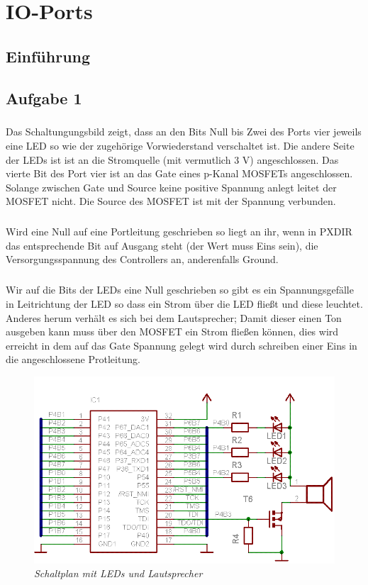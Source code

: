 \chapter{IO-Ports}

\section{Einführung}

\section{Aufgabe 1}

\paragraph*{}
Das Schaltungungsbild zeigt, dass an den Bits Null bis Zwei des Ports vier 
jeweils eine LED so wie der zugehörige Vorwiederstand verschaltet ist. 
Die andere Seite der LEDs ist ist an die Stromquelle (mit vermutlich 3 V) 
angeschlossen. Das vierte Bit des Port vier ist an das Gate eines p-Kanal 
MOSFETs angeschlossen. Solange zwischen Gate und Source keine positive
Spannung anlegt leitet der MOSFET nicht. Die Source des MOSFET ist mit 
der Spannung verbunden.
\paragraph*{}
Wird eine Null auf eine Portleitung geschrieben so liegt an ihr, wenn in
PXDIR das entsprechende Bit auf Ausgang steht (der Wert muss Eins sein), 
die Versorgungsspannung des Controllers an, anderenfalls Ground.
\paragraph*{}
Wir auf die Bits der LEDs eine Null geschrieben so gibt es ein 
Spannungsgefälle in Leitrichtung der LED so dass ein Strom über die LED 
fließt und diese leuchtet. Anderes herum verhält es sich bei dem 
Lautsprecher; Damit dieser einen Ton ausgeben kann muss über den MOSFET
ein Strom fließen können, dies wird erreicht in dem auf das Gate Spannung 
gelegt wird durch schreiben einer Eins in die angeschlossene Protleitung.

\begin{figure}
\centering
\includegraphics[width=\textwidth]{img/mikrocontrollerUNDled.png}
\caption{\em \small Schaltplan mit LEDs und Lautsprecher}
\end{figure}

